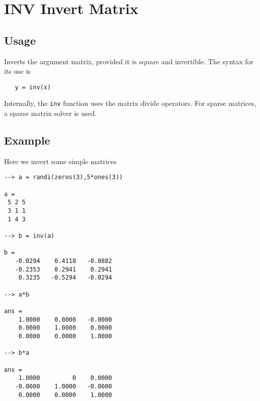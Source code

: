 \section{INV Invert Matrix}

\subsection{Usage}

Inverts the argument matrix, provided it is square and invertible.
The syntax for its use is
\begin{verbatim}
   y = inv(x)
\end{verbatim}
Internally, the \verb|inv| function uses the matrix divide operators.
For sparse matrices, a sparse matrix solver is used.
\subsection{Example}

Here we invert some simple matrices
\begin{verbatim}
--> a = randi(zeros(3),5*ones(3))

a = 
 5 2 5 
 3 1 1 
 1 4 3 

--> b = inv(a)

b = 
   -0.0294    0.4118   -0.0882 
   -0.2353    0.2941    0.2941 
    0.3235   -0.5294   -0.0294 

--> a*b

ans = 
    1.0000    0.0000   -0.0000 
    0.0000    1.0000    0.0000 
    0.0000    0.0000    1.0000 

--> b*a

ans = 
    1.0000         0    0.0000 
   -0.0000    1.0000   -0.0000 
    0.0000    0.0000    1.0000 
\end{verbatim}
